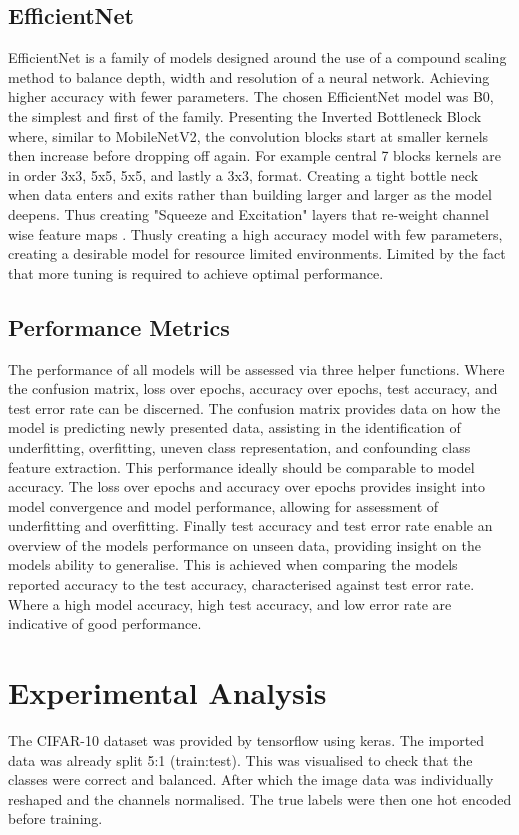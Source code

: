 \documentclass[10pt,twocolumn,letterpaper]{article}
\begin{document}
\subsection{EfficientNet}
EfficientNet is a family of models designed around the use of a compound scaling method to balance depth, width and resolution of a neural network. Achieving higher accuracy with fewer parameters. The chosen EfficientNet model was B0, the simplest and first of the family. Presenting the Inverted Bottleneck Block where, similar to MobileNetV2, the convolution blocks start at smaller kernels then increase before dropping off again. For example central 7 blocks kernels are in order 3x3, 5x5, 5x5, and lastly a 3x3, format. Creating a tight bottle neck when data enters and exits rather than building larger and larger as the model deepens. Thus creating "Squeeze and Excitation" layers that re-weight channel wise feature maps \cite{original_efficientnet} \cite{fintuningefficientnet}. Thusly creating a high accuracy model with few parameters, creating a desirable model for resource limited environments. Limited by the fact that more tuning is required to achieve optimal performance.

\subsection{Performance Metrics}
The performance of all models will be assessed via three helper functions. Where the confusion matrix, loss over epochs, accuracy over epochs, test accuracy, and test error rate can be discerned. The confusion matrix provides data on how the model is predicting newly presented data, assisting in the identification of underfitting, overfitting, uneven class representation, and confounding class feature extraction. This performance ideally should be comparable to model accuracy. The loss over epochs and accuracy over epochs provides insight into model convergence and model performance, allowing for assessment of underfitting and overfitting. Finally test accuracy and test error rate enable an overview of the models performance on unseen data, providing insight on the models ability to generalise. This is achieved when comparing the models reported accuracy to the test accuracy, characterised against test error rate. Where a high model accuracy, high test accuracy, and low error rate are indicative of good performance. 

\section{Experimental Analysis}
\label{sec:expana}
The CIFAR-10 dataset was provided by tensorflow using keras. The imported data was already split 5:1 (train:test). This was visualised to check that the classes were correct and balanced. After which the image data was individually reshaped and the channels normalised. The true labels were then one hot encoded before training. 
\end{document}
